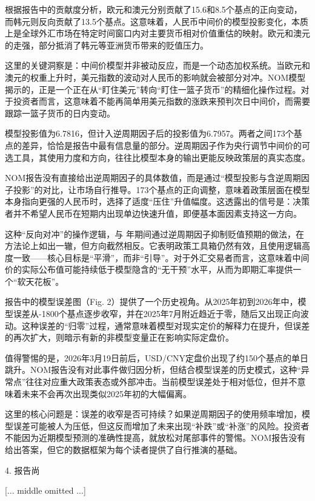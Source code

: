 \documentclass[11pt]{ctexart}
\begin{document}
根据报告中的贡献度分析，欧元和澳元分别贡献了15.6和8.5个基点的正向变动，而韩元则反向贡献了13.5个基点。这意味着，人民币中间价的模型投影变化，本质上是全球外汇市场在特定时间窗口内对主要货币相对价值重估的映射。欧元和澳元的走强，部分抵消了韩元等亚洲货币带来的贬值压力。

这里的关键洞察是：中间价模型并非被动反应，而是一个动态加权系统。当欧元和澳元的权重上升时，美元指数的波动对人民币的影响就会被部分对冲。NOM模型揭示的，正是一个正在从“盯住美元”转向“盯住一篮子货币”的精细化操作过程。对于投资者而言，这意味着不能再简单用美元指数的涨跌来预判次日中间价，而需要跟踪一篮子货币的日内变动。

模型投影值为6.7816，但计入逆周期因子后的投影值为6.7957。两者之间173个基点的差异，恰恰是报告中最有信息量的部分。逆周期因子作为央行调节中间价的可选工具，其使用力度和方向，往往比模型本身的输出更能反映政策层的真实态度。

NOM报告没有直接给出逆周期因子的具体数值，而是通过“模型投影与含逆周期因子投影”的对比，让市场自行推导。173个基点的正向调整，意味着政策层面在模型本身指向更强的人民币时，选择了适度“压住”升值幅度。这透露出的信号是：决策者并不希望人民币在短期内出现单边快速升值，即便基本面因素支持这一方向。

这种“反向对冲”的操作逻辑，与 年期间通过逆周期因子抑制贬值预期的做法，在方法论上如出一辙，但方向截然相反。它表明政策工具箱仍然有效，且使用逻辑高度一致——核心目标是“平滑”，而非“引导”。对于外汇交易者而言，这意味着中间价的实际公布值可能持续低于模型隐含的“无干预”水平，从而为即期汇率提供一个“软天花板”。

报告中的模型误差图（Fig. 2）提供了一个历史视角。从2025年初到2026年中，模型误差从-1800个基点逐步收窄，并在2025年7月附近趋近于零，随后又出现正向波动。这种误差的“归零”过程，通常意味着模型对现实定价的解释力在提升，但误差的再次扩大，则暗示有新的非模型变量正在影响实际定盘价。

值得警惕的是，2026年3月19日前后，USD/CNY定盘价出现了约150个基点的单日跳升。NOM报告没有对此事件做归因分析，但结合模型误差的历史模式，这种“异常点”往往对应重大政策表态或外部冲击。当前模型误差处于相对低位，但并不意味着未来不会再次出现类似2025年初的大幅偏离。

这里的核心问题是：误差的收窄是否可持续？如果逆周期因子的使用频率增加，模型误差可能被人为压低，但这反而增加了未来出现“补跌”或“补涨”的风险。投资者不能因为近期模型预测的准确性提高，就放松对尾部事件的警惕。NOM报告没有给出答案，但它的数据框架为每个读者提供了自行推演的基础。

4. 报告尚

[... middle omitted ...]
\end{document}
